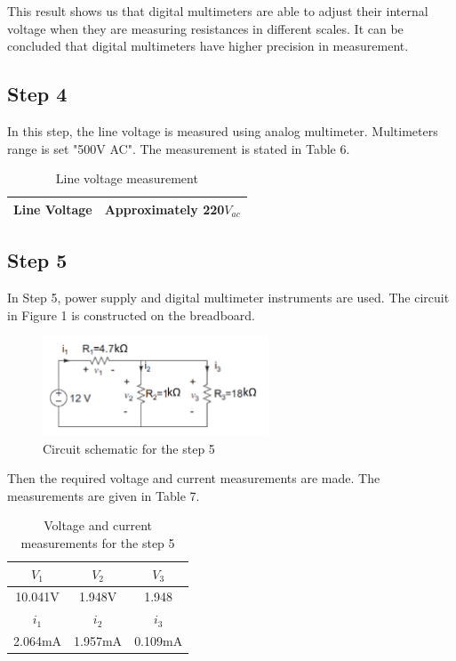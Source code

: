 \documentclass[letterpaper,12pt]{article}
\begin{document}
This result shows us that digital multimeters are able to adjust their internal voltage when they are measuring resistances in different scales. It can be concluded that digital multimeters have higher precision in measurement.

\subsection{Step 4}
In this step, the line voltage is measured using analog multimeter. Multimeters range is set "500V AC". The measurement is stated in Table 6.
\begin{table}[H]
	\begin{center}
		\caption{Line voltage measurement }
		\vspace{2mm}
		\begin{tabular}{|| c | c ||} 
		 \hline
		 Line Voltage & Approximately 220\(V_{ac}\) 		 \\ [0.5ex] 
		
		 \hline
		\end{tabular}
	\end{center}
	
\end{table}

\subsection{Step 5}
In Step 5, power supply and digital multimeter instruments are used. The circuit in Figure 1 is constructed on the breadboard. 
\begin{figure}[H]
	\centering
	\includegraphics[width=0.6\textwidth]{5.png}
	\caption{Circuit schematic for the step 5}
\end{figure} 
Then the required voltage and current measurements are made. The measurements are given in Table 7.
\begin{table}[H]
	\centering
	\caption{Voltage and current measurements for the step 5}
	\vspace{2mm}
	\begin{tabular}{|| c | c | c ||}
		\hline
	\(V_1\) & \(V_2\) & \(V_3\) \\
	\hline
	10.041V & 1.948V & 1.948 \\
	\hline\hline
	\(i_1\) & \(i_2\) & \(i_3\) \\
	\hline
	2.064mA & 1.957mA & 0.109mA\\
	\hline
	\end{tabular}
	
	\end{table}
\end{document}
